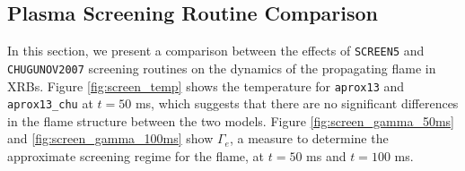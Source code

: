 \documentclass[preprint,times,tighten]{aastex631}
\begin{document}
\subsection{Plasma Screening Routine Comparison}\label{Sec:result_screening}









\begin{figure*}
\centering
{}
\caption{\label{fig:screen_temp} Slice plots comparing temperature for {\tt aprox13} (top panel) and {\tt aprox13\_chu} (bottom panel) at $t = 50$ ms.}
\end{figure*}


\begin{figure*}
\centering
{}
\caption{\label{fig:screen_gamma_50ms} Slice plots comparing $\Gamma_e$ for {\tt aprox13} (top panel) and {\tt aprox13\_chu} (bottom panel) at $t = 50$ ms.}
\end{figure*}


\begin{figure*}
\centering
{}
\caption{\label{fig:screen_gamma_100ms} Slice plots comparing $\Gamma_e$ for {\tt aprox13} (top panel) and {\tt aprox13\_chu} (bottom panel) at $t = 100$ ms.}
\end{figure*}

In this section, we present a comparison between the effects of {\tt SCREEN5} and {\tt CHUGUNOV2007} screening routines on the dynamics of the propagating flame in XRBs. Figure \ref{fig:screen_temp} shows the temperature for {\tt aprox13} and {\tt aprox13\_chu} at $t = 50$ ms, which suggests that there are no significant differences in the flame structure between the two models. Figure \ref{fig:screen_gamma_50ms} and \ref{fig:screen_gamma_100ms} show $\Gamma_e$, a measure to determine the approximate screening regime for the flame, at $t = 50$ ms and $t = 100$ ms. 
\end{document}
